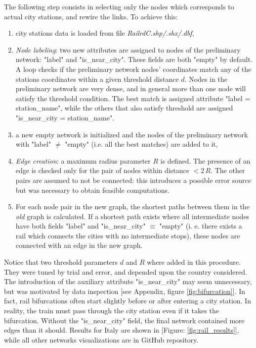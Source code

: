 \bigskip \newline 
The following step consists in selecting only the nodes which corresponds to actual city stations, and rewire the links. To achieve this:
\begin{enumerate}
    \item city stations data is loaded from file \textit{RailrdC.shp/.shx/.dbf},
    \item \textit{Node labeling}: two new attributes are assigned to nodes of the preliminary network: "label" and "is\_near\_city". These fields are both "empty" by default.
    A loop checks if the preliminary network nodes' coordinates match any of the stations coordinates within a given threshold distance $d$. Nodes in the preliminary network are very dense, and in general more than one node will satisfy the threshold condition. The best match is assigned attribute "label = station\_name", while the others that also satisfy threshold are assigned "is\_near\_city = station\_name". 
    \item a new empty network is initialized and the nodes of the preliminary network with "label" $\neq$ "empty" (i.e. all the best matches) are added to it,
    \item \textit{Edge creation}: a maximum radius parameter $R$ is defined. The presence of an edge is checked only for the pair of nodes within distance $<2\,R$. The other pairs are assumed to not be connected: this introduces a possible error source but was necessary to obtain feasible computations.
    \item For each node pair in the new graph, the shortest paths between them in the \textit{old} graph is calculated. If a shortest path exists where all intermediate nodes have both fields "label" and "is\_near\_city" $\equiv$ "empty" (i. e. there exists a rail which connects the cities with no intermediate stops), these nodes are connected with an edge in the new graph.
\end{enumerate}
Notice that two threshold parameters $d$ and $R$ where added in this procedure. They were tuned by trial and error, and depended upon the country considered. The introduction of the auxiliary attribute "is\_near\_city" may seem unnecessary, but was motivated by data inspection [see Appendix, figure \ref{fig:bifurcation}]. In fact, rail bifurcations often start slightly before or after entering a city station. In reality, the train must pass through the city station even if it takes the bifurcation. Without the "is\_near\_city" field, the final network contained more edges than it should. Results for Italy are shown in [Figure: \ref{fig:rail_results}], while all other networks visualizations are in GitHub repository.
